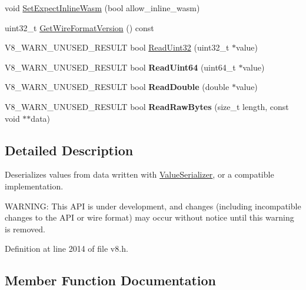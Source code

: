 \begin{DoxyCompactItemize}
void \mbox{\hyperlink{classv8_1_1ValueDeserializer_a2e393ea834f217238fc144f48fd5caf1}{Set\+Expect\+Inline\+Wasm}} (bool allow\+\_\+inline\+\_\+wasm)
\item 
uint32\+\_\+t \mbox{\hyperlink{classv8_1_1ValueDeserializer_aaf8a206c11e0663105e570dd4feb01f9}{Get\+Wire\+Format\+Version}} () const
\item 
V8\+\_\+\+W\+A\+R\+N\+\_\+\+U\+N\+U\+S\+E\+D\+\_\+\+R\+E\+S\+U\+LT bool \mbox{\hyperlink{classv8_1_1ValueDeserializer_a77133b51f7cbad0bdd5faf1f32457abb}{Read\+Uint32}} (uint32\+\_\+t $\ast$value)
\item 
\mbox{\label{classv8_1_1ValueDeserializer_a74f27c249055f24d35c5a794fa99276b}} 
V8\+\_\+\+W\+A\+R\+N\+\_\+\+U\+N\+U\+S\+E\+D\+\_\+\+R\+E\+S\+U\+LT bool {\bfseries Read\+Uint64} (uint64\+\_\+t $\ast$value)
\item 
\mbox{\label{classv8_1_1ValueDeserializer_a968968e1a59d9394e866dd11052c61ba}} 
V8\+\_\+\+W\+A\+R\+N\+\_\+\+U\+N\+U\+S\+E\+D\+\_\+\+R\+E\+S\+U\+LT bool {\bfseries Read\+Double} (double $\ast$value)
\item 
\mbox{\label{classv8_1_1ValueDeserializer_af6b0a523960b72a272cfe571dbd7b7f1}} 
V8\+\_\+\+W\+A\+R\+N\+\_\+\+U\+N\+U\+S\+E\+D\+\_\+\+R\+E\+S\+U\+LT bool {\bfseries Read\+Raw\+Bytes} (size\+\_\+t length, const void $\ast$$\ast$data)
\end{DoxyCompactItemize}


\subsection{Detailed Description}
Deserializes values from data written with \mbox{\hyperlink{classv8_1_1ValueSerializer}{Value\+Serializer}}, or a compatible implementation.

W\+A\+R\+N\+I\+NG\+: This A\+PI is under development, and changes (including incompatible changes to the A\+PI or wire format) may occur without notice until this warning is removed. 

Definition at line 2014 of file v8.\+h.



\subsection{Member Function Documentation}
\mbox{\label{classv8_1_1ValueDeserializer_aaf8a206c11e0663105e570dd4feb01f9}} 
